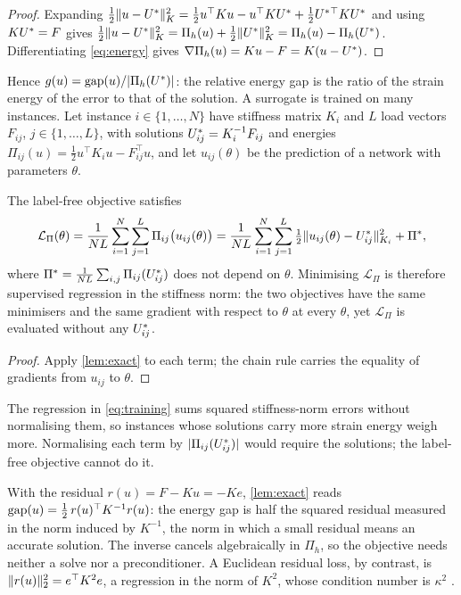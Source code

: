 \begin{proof}
Expanding $\tfrac12\lVert u-U^{\ast}\rVert_K^2=\tfrac12u^{\top}Ku-u^{\top}KU^{\ast}
+\tfrac12U^{\ast}{}^{\top}KU^{\ast}$ and using $KU^{\ast}=F$ gives
$\tfrac12\lVert u-U^{\ast}\rVert_K^2=\Pi_h(u)+\tfrac12\lVert U^{\ast}\rVert_K^2=\Pi_h(u)-\Pi_h(U^{\ast})$.
Differentiating \eqref{eq:energy} gives $\nabla\Pi_h(u)=Ku-F=K(u-U^{\ast})$.
\end{proof}

Hence $g(u)=\operatorname{gap}(u)/\lvert\Pi_h(U^{\ast})\rvert$: the relative energy gap is the ratio of the
strain energy of the error to that of the solution. A surrogate is trained on many
instances. Let instance $i\in\{1,\dots,N\}$ have stiffness matrix $K_i$ and $L$ load
vectors $F_{ij}$, $j\in\{1,\dots,L\}$, with solutions $U^{\ast}_{ij}=K_i^{-1}F_{ij}$ and
energies $\Pi_{ij}(u)=\tfrac12u^{\top}K_iu-F_{ij}^{\top}u$, and let $u_{ij}(\theta)$ be the
prediction of a network with parameters $\theta$.

\begin{corollary}\label{cor:training}
The label-free objective satisfies
\begin{equation}
\mathcal{L}_{\Pi}(\theta) = \frac{1}{NL}\sum_{i=1}^{N}\sum_{j=1}^{L}\Pi_{ij}\bigl(u_{ij}(\theta)\bigr)
= \frac{1}{NL}\sum_{i=1}^{N}\sum_{j=1}^{L}\tfrac12\lVert u_{ij}(\theta)-U^{\ast}_{ij}\rVert_{K_i}^{2}
+ \Pi^{\ast},
\label{eq:training}
\end{equation}
where $\Pi^{\ast}=\frac{1}{NL}\sum_{i,j}\Pi_{ij}(U^{\ast}_{ij})$ does not depend on $\theta$.
Minimising $\mathcal{L}_\Pi$ is therefore supervised regression in the stiffness norm: the
two objectives have the same minimisers and the same gradient with respect to $\theta$ at
every $\theta$, yet $\mathcal{L}_\Pi$ is evaluated without any $U^{\ast}_{ij}$.
\end{corollary}

\begin{proof}
Apply \cref{lem:exact} to each term; the chain rule carries the equality of gradients
from $u_{ij}$ to $\theta$.
\end{proof}

The regression in \eqref{eq:training} sums squared stiffness-norm errors without
normalising them, so instances whose solutions carry more strain energy weigh more.
Normalising each term by $\lvert\Pi_{ij}(U^{\ast}_{ij})\rvert$ would require the solutions;
the label-free objective cannot do it.

\begin{remark}\label{rem:dual}
With the residual $r(u)=F-Ku=-Ke$, \cref{lem:exact} reads
$\operatorname{gap}(u)=\tfrac12\,r(u)^{\top}K^{-1}r(u)$: the energy gap is half the squared residual
measured in the norm induced by $K^{-1}$, the norm in which a small residual means an
accurate solution. The inverse cancels algebraically in $\Pi_h$, so the objective needs
neither a solve nor a preconditioner. A Euclidean residual loss, by contrast, is
$\lVert r(u)\rVert_2^2=e^{\top}K^{2}e$, a regression in the norm of $K^2$, whose condition
number is $\kappa^2$ \cite{DeRyck2024}.
\end{remark}

